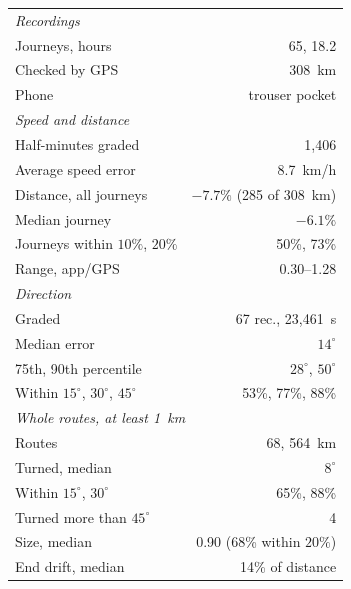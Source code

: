 \begin{tabular}{@{}lr@{}}
\toprule
\multicolumn{2}{l}{\emph{Recordings}} \\
Journeys, hours & 65, 18.2 \\
Checked by GPS & 308~km \\
Phone & trouser pocket \\
\midrule\multicolumn{2}{l}{\emph{Speed and distance}} \\
Half-minutes graded & 1{,}406 \\
Average speed error & 8.7~km/h \\
Distance, all journeys & $-7.7\%$ (285 of 308~km) \\
Median journey & $-6.1\%$ \\
Journeys within $10\%$, $20\%$ & 50\%, 73\% \\
Range, app/GPS & 0.30--1.28 \\
\midrule\multicolumn{2}{l}{\emph{Direction}} \\
Graded & 67 rec., 23{,}461~s \\
Median error & $14^\circ$ \\
75th, 90th percentile & $28^\circ$, $50^\circ$ \\
Within $15^\circ$, $30^\circ$, $45^\circ$ & 53\%, 77\%, 88\% \\
\midrule\multicolumn{2}{l}{\emph{Whole routes, at least 1~km}} \\
Routes & 68, 564~km \\
Turned, median & $8^\circ$ \\
Within $15^\circ$, $30^\circ$ & 65\%, 88\% \\
Turned more than $45^\circ$ & 4 \\
Size, median & 0.90 (68\% within $20\%$) \\
End drift, median & 14\% of distance \\
\bottomrule
\end{tabular}
